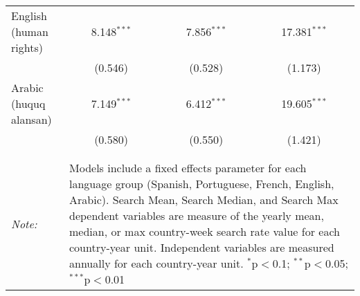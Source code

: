 \begin{table}[!htbp]
\begin{tabular}{@{\extracolsep{5pt}}lccc}
  English (human rights) & 8.148$^{***}$ & 7.856$^{***}$ & 17.381$^{***}$ \\ 
  & (0.546) & (0.528) & (1.173) \\ 
  Arabic (huquq alansan) & 7.149$^{***}$ & 6.412$^{***}$ & 19.605$^{***}$ \\ 
  & (0.580) & (0.550) & (1.421) \\ 
 \hline \\[-1.8ex] 
\hline 
\hline \\[-1.8ex] 
\textit{Note:}  & \multicolumn{3}{l}{\parbox[t]{8cm}{Models include a fixed effects parameter for each language group (Spanish, Portuguese, French, English, Arabic). Search Mean, Search Median, and Search Max dependent variables are measure of the yearly mean, median, or max country-week search rate value for each country-year unit. Independent variables are measured annually for each country-year unit. $^{*}$p$<$0.1; $^{**}$p$<$0.05; $^{***}$p$<$0.01}} \\ 
\end{tabular} 
\end{table} 
